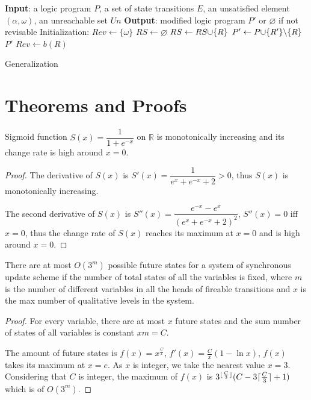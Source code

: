 \begin{algorithm}[ht]
\begin{algorithmic}
    \State \textbf{Input}: a logic program $P$, a set of state transitions $E$, an unsatisfied element $(\alpha,\omega)$, an unreachable set $Un$
    \State \textbf{Output}: modified logic program $P'$ or $\varnothing$ if not revisable
    \State Initialization: $Rev\gets\{\omega\}$
    \Do
    \State $RS\gets \varnothing$
            \State $RS\gets RS\addset{R}$
        \EndIf
    \EndFor
            \State $P'\gets P\addset{R'}\miset{R}$
                    \State\Return $P'$
                \EndIf
            \EndIf
        \EndFor
    \EndFor
        \State $Rev\gets b(R)$
    \EndFor
\end{algorithmic}
\caption{Generalization}\label{alg:generalization}
\end{algorithm}

\chapter{Theorems and Proofs}\label{sec:proof}
\begin{theorem}
    Sigmoid function $S(x)={\dfrac {1}{1+e^{-x}}}$ on $\mathbb{R}$ is monotonically increasing and its change rate is high around $x=0$.
    \begin{proof}
    The derivative of $S(x)$ is $S'(x)=\dfrac{1}{e^x+e^{-x}+2}>0$, thus $S(x)$ is monotonically increasing.
    
    The second derivative of $S(x)$ is $S''(x)=\dfrac{e^{-x}-e^x}{(e^x+e^{-x}+2)^2}$, $S''(x)=0$ iff $x=0$, thus the change rate of $S(x)$ reaches its maximum at $x=0$ and is high around $x=0$.
    \end{proof}
\end{theorem}

\begin{theorem}
    There are at most $O(3^m)$ possible future states for a system of synchronous update scheme if the number of total states of all the variables is fixed, where $m$ is the number of different variables in all the heads of fireable transitions and $x$ is the max number of qualitative levels in the system. 
    \begin{proof}
         For every variable, there are at most $x$ future states and the sum number of states of all variables is constant $xm=C$.
         
         The amount of future states is $f(x)=x^{\frac{C}{x}}$, $f'(x)=\frac{C}{x}(1-\ln x)$, $f(x)$ takes its maximum at $x=e$.
         As $x$ is integer, we take the nearest value $x=3$.
         Considering that $C$ is integer, the maximum of $f(x)$ is $3^{\lfloor\frac{C}{3}\rfloor}(C-3\lceil\frac{C}{3}\rceil+1)$ which is of $O(3^m)$.
    \end{proof}
\end{theorem}

